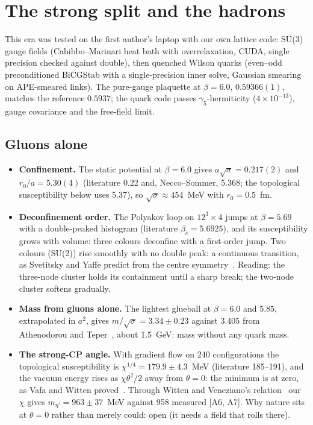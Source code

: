 \documentclass[11pt,a4paper]{article}
\newcommand{\chk}[1]{\textsf{[#1]}}
\begin{document}
\section{The strong split and the hadrons}\label{sec:hadrons}

This era was tested on the first author's laptop with our own lattice code: SU(3) gauge fields (Cabibbo--Marinari heat bath with
overrelaxation, CUDA, single precision checked against double), then quenched Wilson quarks (even--odd preconditioned BiCGStab with a
single-precision inner solve, Gaussian smearing on APE-smeared links). The pure-gauge plaquette at $\beta=6.0$, $0.59366(1)$, matches the
reference $0.5937$; the quark code passes $\gamma_5$-hermiticity ($4\times10^{-13}$), gauge covariance and the free-field limit.

\subsection{Gluons alone}
\begin{itemize}[leftmargin=*,itemsep=2pt]
\item \textbf{Confinement.} The static potential at $\beta=6.0$ gives $a\sqrt\sigma=0.217(2)$ and $r_0/a=5.30(4)$ (literature 0.22 and, Necco--Sommer, 5.368; the topological susceptibility below
uses 5.37), so $\sqrt\sigma\approx454$~MeV with $r_0=0.5$~fm.
\item \textbf{Deconfinement order.} The Polyakov loop on $12^3\times4$ jumps at $\beta=5.69$ with a double-peaked histogram (literature
$\beta_c=5.6925$), and its susceptibility grows with volume: three colours deconfine with a first-order jump. Two colours (SU(2)) rise
smoothly with no double peak: a continuous transition, as Svetitsky and Yaffe predict from the centre symmetry~\cite{svetitsky}. Reading:
the three-node cluster holds its containment until a sharp break; the two-node cluster softens gradually.
\item \textbf{Mass from gluons alone.} The lightest glueball at $\beta=6.0$ and $5.85$, extrapolated in $a^2$, gives
$m/\sqrt\sigma=3.34\pm0.23$ against $3.405$ from Athenodorou and Teper~\cite{athenodorou}, about 1.5~GeV: mass without any quark mass.
\item \textbf{The strong-CP angle.} With gradient flow on 240 configurations the topological susceptibility is $\chi^{1/4}=179.9\pm4.3$~MeV
(literature 185--191), and the vacuum energy rises as $\chi\theta^2/2$ away from $\theta=0$: the minimum is at zero, as Vafa and Witten
proved~\cite{vafawitten}. Through Witten and Veneziano's relation~\cite{witten,veneziano} our $\chi$ gives $m_{\eta'}=963\pm37$~MeV against
958 measured \chk{A6, A7}. Why nature sits at $\theta=0$ rather than merely could: open (it needs a field that rolls there).
\end{itemize}
\end{document}
